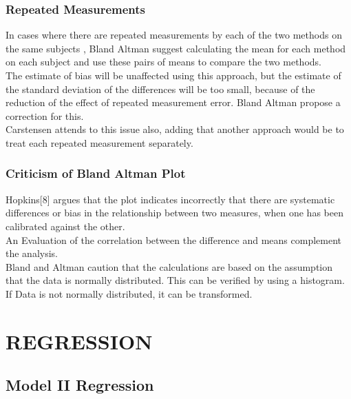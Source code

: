 \documentclass[12pt, a4paper]{report}
\begin{document}
\subsection{Repeated Measurements }
In cases where there are repeated measurements by each of the two
methods on the same subjects , Bland Altman suggest calculating
the mean for each method on each subject and use these pairs of
means to compare the two methods.
\\
The estimate of bias will be unaffected using this approach, but
the estimate of the standard deviation of the differences will be
too small, because of the reduction of the effect of repeated
measurement error. Bland Altman propose a correction for this.
\\
Carstensen attends to this issue also, adding that another
approach would be to treat each repeated measurement separately.

\subsection{Criticism of Bland Altman Plot}
Hopkins[$8$] argues that the plot indicates incorrectly that there
are systematic differences or bias in the relationship between two
measures, when one has been calibrated against the other.
\\
An Evaluation of the correlation between the difference and means
complement the analysis.
\\
Bland and Altman caution that the calculations are based on the
assumption that the data is normally distributed. This can be
verified by using a histogram. If Data is not normally
distributed, it can be transformed.









\chapter{REGRESSION}%
\section{Model II Regression}
\end{document}
